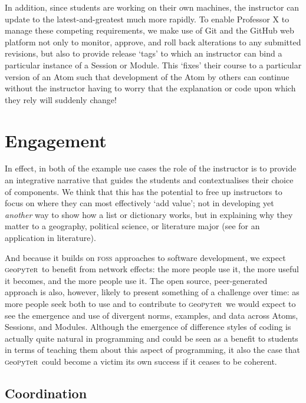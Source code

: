 \documentclass[letter, 11pt,titlepage]{article}
\newcommand{\gp}{\textsc{g}eo\textsc{p}y\textsc{t}e\textsc{r}~\/}
\newcommand{\comment}[1]{\todo[inline, color=green!40]{#1}}
\begin{document}
In addition, since students are working on their own machines, the instructor can update to the latest-and-greatest much more rapidly. To enable Professor X to manage these competing requirements, we make use of Git and the GitHub web platform not only to monitor, approve, and roll back alterations to any submitted revisions, but also to provide release `tags' to which an instructor can bind a particular instance of a Session or Module. This `fixes' their course to a particular version of an Atom such that development of the Atom by others can continue without the instructor having to worry that the explanation or code upon which they rely will suddenly change! 

\section{Engagement}\label{sec:engagement}

In effect, in both of the example use cases the role of the instructor is to provide an integrative narrative that guides the students and contextualises their choice of components. We think that this has the potential to free up instructors to focus on where they can most effectively `add value'; not in developing yet \emph{another} way to show how a list or dictionary works, but in explaining why they matter to a geography, political science, or literature major (see \citealp{Bort2015} for an application in literature).

And because it builds on \textsc{foss} approaches to software development, we expect \gp to benefit from network effects: the more people use it, the more useful it becomes, and the more people use it. The open source, peer-generated approach is also, however, likely to present something of a challenge over time: as more people seek both to use and to contribute to \gp we would expect to see the emergence and use of divergent norms, examples, and data across Atoms, Sessions, and Modules. Although the emergence of difference styles of coding is actually quite natural in programming and could be seen as a benefit to students in terms of teaching them about this aspect of programming, it also the case that \gp could become a victim its own success if it ceases to be coherent.

\subsection{Coordination}

\comment{Is this characterisation accurate?}
\end{document}
